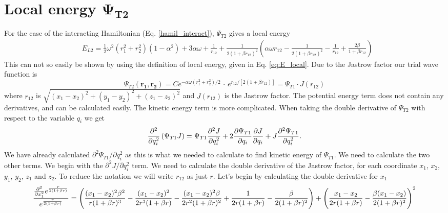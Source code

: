 \documentclass[%
 reprint,
nofootinbib,
aps,
]{revtex4-1}
\begin{document}
\section{Local energy $\boldsymbol{\Psi_{T2}}$}\label{sec:appendix_trial_2}
For the case of the interacting Hamiltonian (Eq. \eqref{hamil_interact}), $\Psi_{T2}$ gives a local energy
\begin{align}
 &E_{L2} = \frac{1}{2}\omega^2\left(r_1^2 + r_2^2 \right)\left( 1 - \alpha^2  \right) + 3\alpha \omega + \frac{1}{r_{12}} + \frac{1}{2\left(1+\beta r_{12}\right)^2}\left(\alpha\omega r_{12} - \frac{1}{2\left(1+\beta r_{12}\right)^2} - \frac{1}{r_{12}}  + \frac{2\beta}{1+\beta r_{12}}\right)
\end{align}
This can not so easily be shown by using the definition of local energy, given in Eq. \eqref{eq:E_local}. Due to the Jastrow factor our trial wave function is
\begin{equation}
    \Psi_{T2}(\mathbf{r_1}, \mathbf{r_2}) = C e^{-\alpha\omega(r_1^2 + r_2^2)/2}\,\cdot\, e^{r_{12}/[2\left( 1 + \beta r_{12} \right)]} = \Psi_{T1}\cdot J(r_{12})
\end{equation}
where $r_{12}$ is $\sqrt{(x_1-x_2)^2 + (y_1-y_2)^2 + (z_1-z_2)^2}$ and $J(r_{12})$ is the Jastrow factor. The potential energy term does not contain any derivatives, and can be calculated easily. The kinetic energy term is more complicated. When taking the double derivative of $\Psi_{T2}$ with respect to the variable $q_i$ we get
\begin{equation}
  \pdv[2]{}{q_i}\left(\Psi_{T1} J\right) = \Psi_{T1}\pdv[2]{J}{q_i} + 2\pdv{\Psi_{T1}}{q_i}\pdv{J}{q_i} + J\pdv[2]{\Psi_{T1}}{q_i}.
\end{equation}
We have already calculated $\partial^2\Psi_{T1}/\partial q_i^2$ as this is what we needed to calculate to find kinetic energy of $\Psi_{T1}$. We need to calculate the two other terms. We begin with the $\partial^2 J/\partial q_i^2$ term. We need to calculate the double derivative of the Jastrow factor, for each coordinate $x_1$, $x_2$, $y_1$, $y_2$, $z_1$ and $z_2$. To reduce the notation we will write $r_{12}$ as just $r$. Let's begin by calculating the double derivative for $x_1$
\begingroup\makeatletter\def\f@size{8.5}\check@mathfonts
\begin{gather}
  \frac{\pdv[2]{}{x_1}e^{\frac{r}{2( 1 + \beta r)}}}{e^{\frac{r}{2( 1 + \beta r)}}} =
  \Bigg( \frac{(x_1-x_2)^2\beta^2}{r(1+\beta r)^3} - \frac{(x_1-x_2)^2}{2r^3(1+\beta r)} - \frac{(x_1-x_2)^2\beta}{2r^2(1+\beta r)^2} +\frac{1}{2r(1+\beta r)}-\frac{\beta}{2(1+\beta r)^2}\Bigg) +\Bigg( \frac{x_1-x_2}{2r(1+\beta r)} - \frac{\beta(x_1-x_2)}{2(1+\beta r)^2}  \Bigg)^2
\end{gather}
\end{document}
